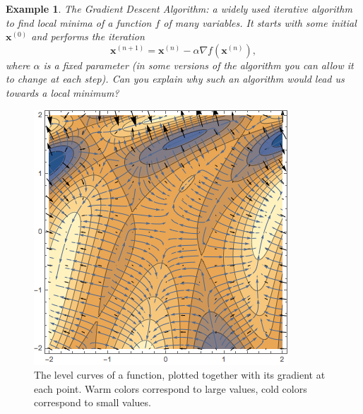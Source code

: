\documentclass[12pt]{article}
\newtheorem{example}{Example}
\renewcommand{\n}{\nabla}
\newcommand{\bx}{\mathbf{x}}
\begin{document}
\begin{example} The Gradient Descent Algorithm: a widely used iterative algorithm to find local minima of a function $f$ of many variables. It starts with some initial $\bx^{(0)}$ and performs the iteration $$\bx^{(n+1)}=\bx^{(n)}-\alpha \n f(\bx^{(n)}),$$ where $\alpha $ is a fixed parameter (in some versions of the algorithm you can allow it to change at each step). Can you explain why such an algorithm would lead us towards a local minimum?
\end{example}

\begin{figure}
\includegraphics[scale=.5]{graphic.png}
\caption{The level curves of a function, plotted together with its gradient at each point. Warm colors correspond to large values, cold colors correspond to small values.}
\end{figure}
\end{document}
